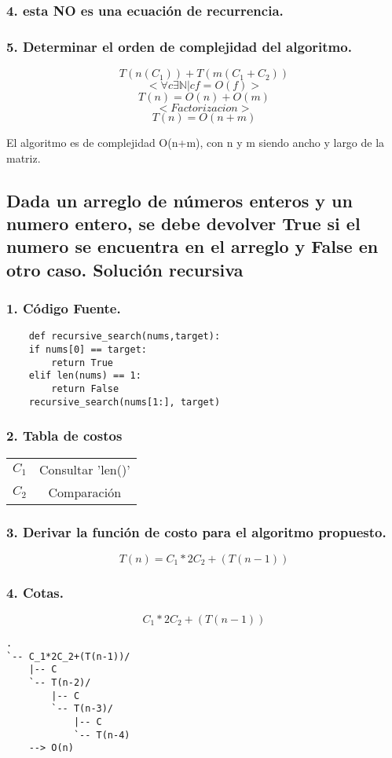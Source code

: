 \documentclass[12pt]{exam}
\begin{document}
\subsubsection*{4. esta NO es una ecuación de recurrencia.}
\subsubsection*{5. Determinar el orden de complejidad del algoritmo.}

$$ T(n(C_1)) + T(m(C_1+C_2)) $$
$$< \forall c \exists \mathbb{N} | cf = O(f) >$$
$$ T(n) = O(n) + O(m) $$
$$ < Factorizacion > $$ 
$$ T(n) = O(n+m) $$


El algoritmo es de complejidad O(n+m), con n y m siendo ancho y largo de la
matriz.

\subsection*{Dada un arreglo de números enteros y un numero entero, se debe devolver
True si el numero se encuentra en el arreglo y False en otro caso. Solución recursiva}
\subsubsection*{1. Código Fuente.}
\begin{verbatim}
    def recursive_search(nums,target):
    if nums[0] == target:
        return True
    elif len(nums) == 1:
        return False
    recursive_search(nums[1:], target)
\end{verbatim}

\subsubsection*{2. Tabla de costos}
\begin{center}
    \begin{tabular}{||c c||}
        $C_1$ & Consultar 'len()' \\
        $C_2$ & Comparación\\
    \end{tabular}
\end{center}


\subsubsection*{3. Derivar la función de costo para el algoritmo propuesto.}
$$ T(n) = C_1*2C_2+(T(n-1)) $$

\subsubsection*{4. Cotas.}
$$ C_1*2C_2+(T(n-1)) $$
\begin{verbatim}
.
`-- C_1*2C_2+(T(n-1))/
    |-- C
    `-- T(n-2)/
        |-- C
        `-- T(n-3)/
            |-- C
            `-- T(n-4)
    --> O(n)
\end{verbatim}
\end{document}
